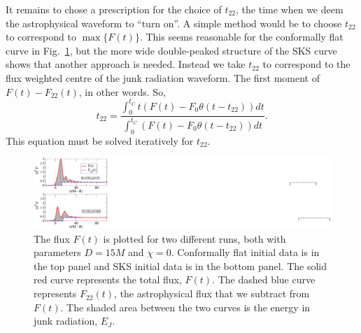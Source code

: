 It remains to chose a prescription for the choice of $t_{22}$, the
time when we deem the astrophysical waveform to ``turn on''.
A simple method would be to choose
$t_{22}$ to correspond to $\max\{F(t)\}$. This seems reasonable for
the conformally flat curve in Fig.~\ref{fig:FluxSample}, but the
more wide double-peaked structure of the SKS curve shows that another
approach is needed. Instead we take $t_{22}$ to correspond to the flux
weighted centre of the junk radiation waveform. The first moment of
$F(t)-F_{22}(t)$, in other words. So,
\begin{equation}\label{eq:t22}
t_{22}=\frac{\int_0^{t_C}{t\left(F\left(t\right)-F_0\theta\left(t-t_{22}\right)\right)dt}}{\int_0^{t_C}{\left(F\left(t\right)-F_0\theta\left(t-t_{22}\right)\right)dt}}.
\end{equation}
This equation must be solved iteratively for $t_{22}$.

\begin{figure}
 \includegraphics[scale=0.95]{chap5/FluxSample}
  \caption[The flux, $F(t)$, and the computation of $E_J$ for CF and
  SKS intitial data.]{The flux $F(t)$ is plotted for two different runs, both
    with parameters $D=15M$ and $\chi=0$. Conformally flat initial
    data is in the top panel and SKS initial data is in the bottom
    panel. The solid red curve represents the total flux, $F(t)$. The
    dashed blue curve represents $F_{22}(t)$, the astrophysical flux
    that we subtract from $F(t)$. The shaded area between the two
    curves is the energy in junk radiation, $E_J$.
}
  \label{fig:FluxSample}
\end{figure}


